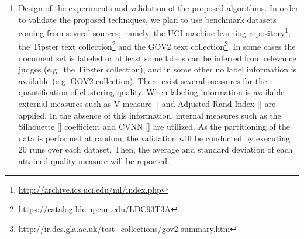 \documentclass[10pt]{article}
\begin{document}
\begin{enumerate}
\item Design of the experiments and validation of the proposed algorithms. 
    In order to validate the proposed techniques, we plan to use benchmark datasets coming from several sources; namely, the UCI machine learning repository\footnote{\url{http://archive.ics.uci.edu/ml/index.php}}, the Tipster text collection\footnote{\url{https://catalog.ldc.upenn.edu/LDC93T3A}} and the GOV2 text collection\footnote{\url{http://ir.dcs.gla.ac.uk/test_collections/gov2-summary.htm}}. 
In some cases the document set is labeled or at least some labels can be inferred from relevance judges (e.g.\ the Tipster collection), and in some other no label information is available (e.g. GOV2 collection).
 There exist several measures for the quantification of clustering quality. When labeling information is available external measures such as V-measure [\citep{RH07}] and Adjusted Rand Index [\citep{HA85}] are applied. 
In the absence of this information, internal measures such as the Silhouette [\citep{R87}] coefficient and CVNN [\citep{LLXGWW13}] are utilized.
As the partitioning of the data is performed at random, the validation will be conducted by executing 20 runs over each dataset. Then, the average and standard deviation of each attained quality measure will be reported.

\end{enumerate}
\end{document}
